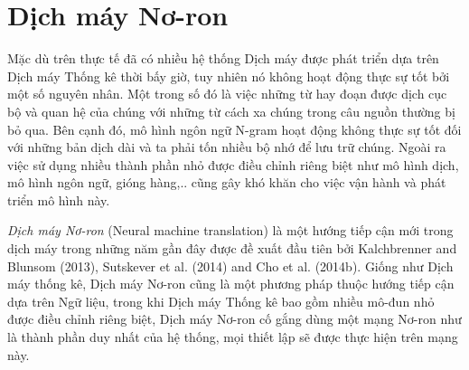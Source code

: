 
\section{Dịch máy Nơ-ron}

Mặc dù trên thực tế đã có nhiều hệ thống Dịch máy được phát triển dựa trên Dịch máy Thống kê thời bấy giờ, tuy nhiên nó không hoạt động thực sự tốt bởi một số nguyên nhân. Một trong số đó là việc những từ hay đoạn được dịch cục bộ và quan hệ của chúng với những từ cách xa chúng trong câu nguồn thường bị bỏ qua. Bên cạnh đó, mô hình ngôn ngữ N-gram hoạt động không thực sự tốt đối với những bản dịch dài và ta phải tốn nhiều bộ nhớ để lưu trữ chúng. Ngoài ra việc sử dụng nhiều thành phần nhỏ được điều chỉnh riêng biệt như mô hình dịch, mô hình ngôn ngữ, gióng hàng,.. cũng gây khó khăn cho việc vận hành và phát triển mô hình này.

\textit{Dịch máy Nơ-ron} (Neural machine translation) là một hướng tiếp cận mới trong dịch máy trong những năm gần đây được đề xuất đầu tiên bởi Kalchbrenner and Blunsom (2013), Sutskever et al. (2014) and Cho et al. (2014b). Giống như Dịch máy thống kê, Dịch máy Nơ-ron cũng là một phương pháp thuộc hướng tiếp cận dựa trên Ngữ liệu, trong khi Dịch máy Thống kê bao gồm nhiều mô-đun nhỏ được điều chỉnh riêng biệt, Dịch máy Nơ-ron cố gắng dùng một mạng Nơ-ron như là thành phần duy nhất của hệ thống, mọi thiết lập sẽ được thực hiện trên mạng này. 

